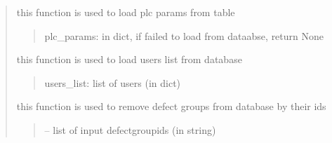 \documentclass[letterpaper,10pt,english]{sphinxmanual}
\begin{document}
\begin{quote}
\begin{savenotes}
\begin{fulllineitems}
\begin{savenotes}\begin{fulllineitems}
\label{\detokenize{setting/database_utils:oxin.database_utils.dataBaseUtils.load_plc_parms}}
\pysigstartsignatures
{}
\pysigstopsignatures
\sphinxAtStartPar
this function is used to load plc params from table
\begin{quote}\begin{description}
\sphinxAtStartPar
plc\_params: in dict, if failed to load from dataabse, return None

\end{description}\end{quote}

\end{fulllineitems}\end{savenotes}


\begin{savenotes}\begin{fulllineitems}
\label{\detokenize{setting/database_utils:oxin.database_utils.dataBaseUtils.load_users}}
\pysigstartsignatures
{}
\pysigstopsignatures
\sphinxAtStartPar
this function is used to load users list from database
\begin{quote}\begin{description}
\sphinxAtStartPar
users\_list: list of users (in dict)

\end{description}\end{quote}

\end{fulllineitems}\end{savenotes}


\begin{savenotes}\begin{fulllineitems}
\label{\detokenize{setting/database_utils:oxin.database_utils.dataBaseUtils.remove_defect_groups}}
\pysigstartsignatures
{}
\pysigstopsignatures
\sphinxAtStartPar
this function is used to remove defect groups from database by their ids
\begin{quote}\begin{description}
\sphinxAtStartPar
{} – list of input defect\sphinxhyphen{}group\sphinxhyphen{}ids (in string)


\end{description}
\end{quote}
\end{fulllineitems}
\end{savenotes}
\end{fulllineitems}
\end{savenotes}
\end{quote}
\end{document}
